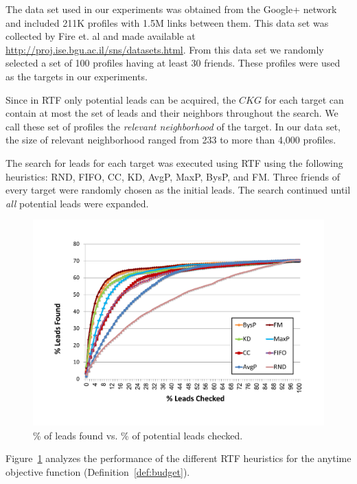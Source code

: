 \documentclass[prodmode,acmtecs]{acmsmall} %
\newcommand{\note}[2]{\textbf{\textsc{#1} says: \textit{#2}}}
\newcommand{\islead}[1]{{\em IsLead(#1)}}
\newcommand{\acquire}[1]{{\em Acquire(#1)}}
\begin{document}
The data set used in our experiments was obtained from the Google+ network and included 211K profiles with 1.5M links between them. This data set was collected by Fire et. al \cite{fire2011linkPrediction} and made available at \url{http://proj.ise.bgu.ac.il/sns/datasets.html}. From this data set we randomly selected  a set of 100 profiles having at least 30 friends. These profiles were used as the targets in our experiments. 


Since in RTF only potential leads can be acquired, the $CKG$ for each target can contain at most the set of leads and their neighbors throughout the search. We call these set of profiles the {\em relevant neighborhood} of the target. In our data set, the size of relevant neighborhood ranged from 233 to more than 4,000 profiles. 

The search for leads for each target was executed using RTF using the following heuristics: RND, FIFO, CC, KD, AvgP, MaxP, BysP, and FM. Three friends of every target were randomly chosen as the initial leads. The search continued until {\em all} potential leads were expanded.

 
 
\begin{figure}%
\centering
\includegraphics[width=0.5\linewidth,  trim={2.0cm 2.5cm 2.5cm 2.0cm},clip]{BTF_all.pdf}
\caption{\% of leads found vs. \% of potential leads checked.}
\label{fig:checkedVsFound}
\end{figure}
Figure~\ref{fig:checkedVsFound} analyzes the performance of the different RTF heuristics
for the anytime objective function (Definition~\ref{def:budget}). 
\end{document}
